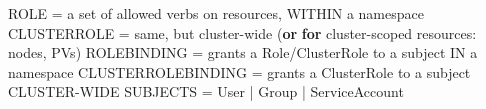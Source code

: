 \documentclass[11pt]{article}
\newenvironment{Shaded}{\begin{snugshade}}{\end{snugshade}}
\newcommand{\BuiltInTok}[1]{\textcolor[rgb]{0.50,0.55,0.55}{#1}}
\newcommand{\ControlFlowTok}[1]{\textcolor[rgb]{0.99,0.74,0.29}{\textbf{#1}}}
\newcommand{\KeywordTok}[1]{\textcolor[rgb]{0.81,0.81,0.76}{\textbf{#1}}}
\newcommand{\NormalTok}[1]{\textcolor[rgb]{0.81,0.81,0.76}{#1}}
\newcommand{\OperatorTok}[1]{\textcolor[rgb]{0.81,0.81,0.76}{#1}}
\begin{document}
\begin{Shaded}
\begin{Highlighting}[]
\NormalTok{ROLE          }\OperatorTok{=}\NormalTok{ a }\BuiltInTok{set}\NormalTok{ of allowed verbs on resources, WITHIN a namespace}
\NormalTok{CLUSTERROLE   }\OperatorTok{=}\NormalTok{ same, but cluster}\OperatorTok{{-}}\NormalTok{wide (}\KeywordTok{or} \ControlFlowTok{for}\NormalTok{ cluster}\OperatorTok{{-}}\NormalTok{scoped resources: nodes, PVs)}
\NormalTok{ROLEBINDING        }\OperatorTok{=}\NormalTok{ grants a Role}\OperatorTok{/}\NormalTok{ClusterRole to a subject IN a namespace}
\NormalTok{CLUSTERROLEBINDING }\OperatorTok{=}\NormalTok{ grants a ClusterRole to a subject CLUSTER}\OperatorTok{{-}}\NormalTok{WIDE}
\NormalTok{SUBJECTS }\OperatorTok{=}\NormalTok{ User }\OperatorTok{|}\NormalTok{ Group }\OperatorTok{|}\NormalTok{ ServiceAccount}
\end{Highlighting}
\end{Shaded}

\end{document}
